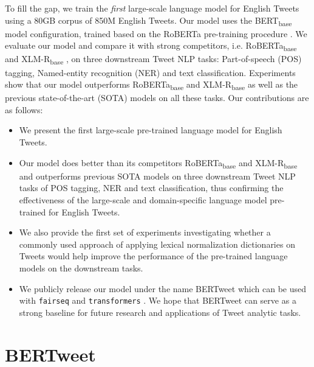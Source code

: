 \documentclass[11pt,a4paper]{article}
\begin{document}
To fill the gap, we train the \textit{first} large-scale language model for English Tweets using a 80GB corpus of 850M English Tweets. Our model uses the BERT\textsubscript{base} model configuration, trained based on the RoBERTa pre-training procedure \citep{RoBERTa}. 
We evaluate our model and compare it with strong competitors, i.e. RoBERTa\textsubscript{base} and XLM-R\textsubscript{base} \citep{conneau2019unsupervised}, on three downstream Tweet NLP tasks:  Part-of-speech (POS) tagging, Named-entity recognition (NER) and text classification. Experiments show that our model outperforms  RoBERTa\textsubscript{base} and XLM-R\textsubscript{base} as well as the previous  state-of-the-art (SOTA) models on 
all these tasks. Our contributions are as follows:

\begin{itemize}[leftmargin=*]
\setlength\itemsep{-1pt}
    \item We present the {first} large-scale  pre-trained language model for English Tweets.
    
    \item Our model does better than its competitors RoBERTa\textsubscript{base} and XLM-R\textsubscript{base} and outperforms previous SOTA models on three downstream Tweet NLP tasks of POS tagging, NER and text classification, thus confirming the effectiveness of the large-scale and domain-specific language model pre-trained for English Tweets.
    
    \item We also provide the first set of experiments investigating whether  a commonly used approach of applying lexical normalization dictionaries  on Tweets \cite{han-etal-2012-automatically} would help improve the performance of the pre-trained language models  on the downstream tasks.
    
    \item We publicly release our model under the name {BERTweet} which can be used with   \texttt{fairseq}  \citep{ott2019fairseq} and \texttt{transformers} \cite{Wolf2019HuggingFacesTS}. We hope that BERTweet can serve as a strong baseline for future  research and applications of Tweet analytic tasks.
\end{itemize}



\section{BERTweet} \label{sec:bertweet}
\end{document}
